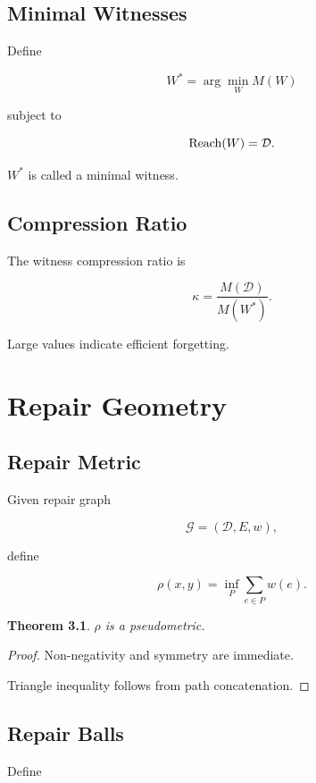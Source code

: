 \documentclass[12pt,oneside]{book}
\theoremstyle{plain} \newtheorem{theorem}{Theorem}[chapter] \newtheorem{lemma}[theorem]{Lemma} \newtheorem{proposition}[theorem]{Proposition} \newtheorem{corollary}[theorem]{Corollary}
\theoremstyle{definition} \newtheorem{definition}[theorem]{Definition} \newtheorem{axiom}[theorem]{Axiom} \newtheorem{construction}[theorem]{Construction}
\theoremstyle{remark} \newtheorem{remark}[theorem]{Remark} \newtheorem{example}[theorem]{Example}
\newcommand{\D}{\mathcal{D}} \newcommand{\R}{\mathcal{R}} \newcommand{\F}{\mathcal{F}} \newcommand{\U}{\mathcal{U}} \newcommand{\M}{\mathcal{M}} \newcommand{\G}{\Gamma}
\begin{document}
\section{Minimal Witnesses}

Define

\[
W^*
=
\arg\min_W
M(W)
\]

subject to

\[
\Reach(W)
=
\D.
\]

$W^*$ is called a minimal witness.

\section{Compression Ratio}

The witness compression ratio is

\[
\kappa
=
\frac{M(\D)}
{M(W^*)}.
\]

Large values indicate efficient forgetting.

\chapter{Repair Geometry}

\section{Repair Metric}

Given repair graph

\[
\mathcal G=(\D,E,w),
\]

define

\[
\rho(x,y)
=
\inf_P
\sum_{e\in P}
w(e).
\]

\begin{theorem}

$\rho$ is a pseudometric.

\end{theorem}

\begin{proof}

Non-negativity and symmetry are immediate.

Triangle inequality follows from path concatenation.

\end{proof}

\section{Repair Balls}

Define
\end{document}
